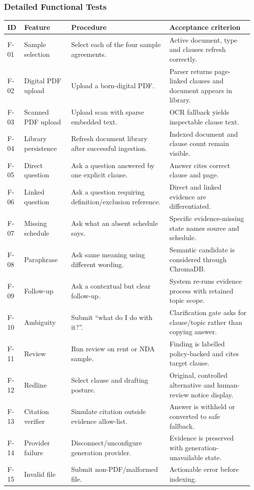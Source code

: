 \documentclass[12pt,a4paper,oneside]{report}
\begin{document}
\subsubsection{Detailed Functional Tests}
\begin{longtable}{p{}p{}p{}p{}}
\toprule
\textbf{ID} & \textbf{Feature} & \textbf{Procedure} & \textbf{Acceptance criterion}\\
\midrule
F-01 & Sample selection & Select each of the four sample agreements. & Active document, type and clauses refresh correctly.\\
F-02 & Digital PDF upload & Upload a born-digital PDF. & Parser returns page-linked clauses and document appears in library.\\
F-03 & Scanned PDF upload & Upload scan with sparse embedded text. & OCR fallback yields inspectable clause text.\\
F-04 & Library persistence & Refresh document library after successful ingestion. & Indexed document and clause count remain visible.\\
F-05 & Direct question & Ask a question answered by one explicit clause. & Answer cites correct clause and page.\\
F-06 & Linked question & Ask a question requiring definition/exclusion reference. & Direct and linked evidence are differentiated.\\
F-07 & Missing schedule & Ask what an absent schedule says. & Specific evidence-missing state names source and schedule.\\
F-08 & Paraphrase & Ask same meaning using different wording. & Semantic candidate is considered through ChromaDB.\\
F-09 & Follow-up & Ask a contextual but clear follow-up. & System re-runs evidence process with retained topic scope.\\
F-10 & Ambiguity & Submit ``what do I do with it?''. & Clarification gate asks for clause/topic rather than copying answer.\\
F-11 & Review & Run review on rent or NDA sample. & Finding is labelled policy-backed and cites target clause.\\
F-12 & Redline & Select clause and drafting posture. & Original, controlled alternative and human-review notice display.\\
F-13 & Citation verifier & Simulate citation outside evidence allow-list. & Answer is withheld or converted to safe fallback.\\
F-14 & Provider failure & Disconnect/unconfigure generation provider. & Evidence is preserved with generation-unavailable state.\\
F-15 & Invalid file & Submit non-PDF/malformed file. & Actionable error before indexing.\\
\bottomrule
\end{longtable}
\end{document}

